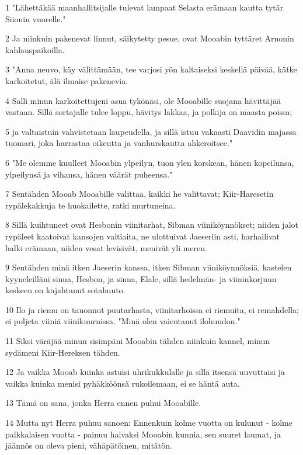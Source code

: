\par 1 "Lähettäkää maanhallitsijalle tulevat lampaat Selasta erämaan kautta tytär Siionin vuorelle."
\par 2 Ja niinkuin pakenevat linnut, säikytetty pesue, ovat Mooabin tyttäret Arnonin kahlauspaikoilla.
\par 3 "Anna neuvo, käy välittämään, tee varjosi yön kaltaiseksi keskellä päivää, kätke karkoitetut, älä ilmaise pakenevia.
\par 4 Salli minun karkoitettujeni asua tykönäsi, ole Mooabille suojana hävittäjää vastaan. Sillä sortajalle tulee loppu, hävitys lakkaa, ja polkija on maasta poissa;
\par 5 ja valtaistuin vahvistetaan laupeudella, ja sillä istuu vakaasti Daavidin majassa tuomari, joka harrastaa oikeutta ja vanhurskautta ahkeroitsee."
\par 6 "Me olemme kuulleet Mooabin ylpeilyn, tuon ylen korskean, hänen kopeilunsa, ylpeilynsä ja vihansa, hänen väärät puheensa."
\par 7 Sentähden Mooab Mooabille valittaa, kaikki he valittavat; Kiir-Haresetin rypälekakkuja te huokailette, ratki murtuneina.
\par 8 Sillä kuihtuneet ovat Hesbonin viinitarhat, Sibman viiniköynnökset; niiden jalot rypäleet kaatoivat kansojen valtiaita, ne ulottuivat Jaeseriin asti, harhailivat halki erämaan, niiden vesat levisivät, menivät yli meren.
\par 9 Sentähden minä itken Jaeserin kanssa, itken Sibman viiniköynnöksiä, kastelen kyyneleilläni sinua, Hesbon, ja sinua, Elale, sillä hedelmän- ja viininkorjuun keskeen on kajahtanut sotahuuto.
\par 10 Ilo ja riemu on tauonnut puutarhasta, viinitarhoissa ei riemuita, ei remahdella; ei poljeta viiniä viinikuurnissa. "Minä olen vaientanut ilohuudon."
\par 11 Siksi väräjää minun sisimpäni Mooabin tähden niinkuin kannel, minun sydämeni Kiir-Hereksen tähden.
\par 12 Ja vaikka Mooab kuinka astuisi uhrikukkulalle ja sillä itsensä uuvuttaisi ja vaikka kuinka menisi pyhäkköönsä rukoilemaan, ei se häntä auta.
\par 13 Tämä on sana, jonka Herra ennen puhui Mooabille.
\par 14 Mutta nyt Herra puhuu sanoen: Ennenkuin kolme vuotta on kulunut - kolme palkkalaisen vuotta - painuu halvaksi Mooabin kunnia, sen suuret laumat, ja jäännös on oleva pieni, vähäpätöinen, mitätön.

